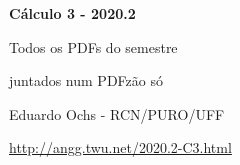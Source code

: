 \documentclass[oneside,12pt]{article}
\begin{document}

\def\drafturl{http://angg.twu.net/LATEX/2020-2-C3.pdf}
\def\drafturl{http://angg.twu.net/2020.2-C3.html}
\def\draftfooter{\tiny \href{\drafturl}{\jobname{}} \ColorBrown{\shorttoday{} \hours}}



%

\thispagestyle{empty}

\begin{center}

\vspace*{1.2cm}

{\bf \Large Cálculo 3 - 2020.2}

\bsk

Todos os PDFs do semestre

juntados num PDFzão só

\bsk

Eduardo Ochs - RCN/PURO/UFF

\url{http://angg.twu.net/2020.2-C3.html}

\end{center}

\newpage

\def\incl#1{}

\incl{2020-2-C3-intro}

\incl{2020-2-C3-vetor-tangente}

\incl{2020-2-C3-aceleracao}

\incl{2020-2-C3-taylor}

\incl{2020-2-C3-rcadeia1}

\incl{2020-2-C3-MT1}

\incl{2020-2-C3-plano-tang}

\incl{2020-2-C3-MT2}

\incl{2020-2-C3-P1}

\incl{2020-2-C3-P2}


\end{document}
